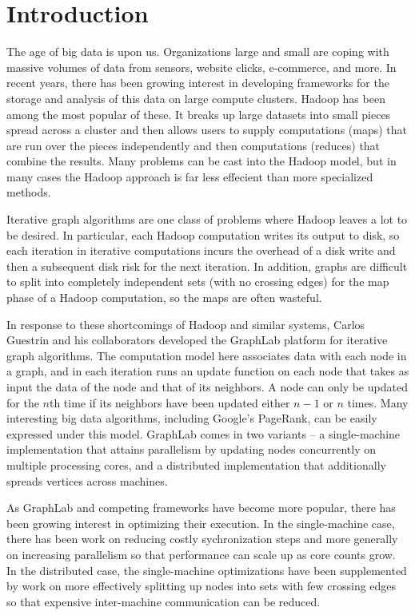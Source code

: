\documentclass[journal]{IEEEtran}
\begin{document}
\section{Introduction}
The age of big data is upon us. Organizations large and small are coping with massive volumes of data from sensors, website clicks, e-commerce, and more. In recent years, there has been growing
interest in developing frameworks for the storage and analysis of this data on large compute clusters. Hadoop \cite{hadoop} has been among the most popular of these. It breaks up large datasets into small pieces spread across a cluster and then allows users to supply computations (maps) that are run over the pieces independently and then computations (reduces) that combine the results. Many problems can be cast into the Hadoop model, but in many cases the Hadoop approach is far less effecient than more specialized methods.

Iterative graph algorithms are one class of problems where Hadoop leaves a lot to be desired. In particular, each Hadoop computation writes its output to disk, so each iteration in iterative computations incurs the overhead of a disk write and then a subsequent disk risk for the next iteration. In addition, graphs are difficult to split into completely independent sets (with no crossing edges) for the map phase of a Hadoop computation, so the maps are often wasteful.

In response to these shortcomings of Hadoop and similar systems, Carlos Guestrin and his collaborators developed the GraphLab platform \cite{graphlab} for iterative graph algorithms. The computation model here associates data with each node in a graph, and in each iteration runs an update function on each node that takes as input the data of the node and that of its neighbors. A node can only be updated for the $n$th time if its neighbors have been updated either $n-1$ or $n$ times. Many interesting big data algorithms, including Google's PageRank, can be easily expressed under this model. GraphLab comes in two variants -- a single-machine implementation that attains parallelism by updating nodes concurrently on multiple processing cores, and a distributed implementation that additionally spreads vertices across machines.

As GraphLab and competing frameworks have become more popular, there has been growing interest in optimizing their execution. In the single-machine case, there has been work on reducing costly sychronization steps and more generally on increasing parallelism so that performance can scale up as core counts grow. In the distributed case, the single-machine optimizations have been supplemented by work on more effectively splitting up nodes into sets with few crossing edges so that expensive inter-machine communication can be reduced.
\end{document}
